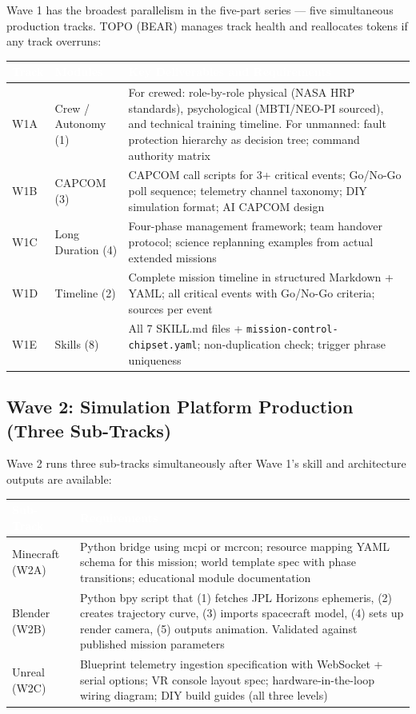 \documentclass[11pt,letterpaper]{article}
\newcommand{\tableheader}[1]{\textbf{\sffamily\textcolor{white}{#1}}}
\begin{document}
Wave 1 has the broadest parallelism in the five-part series --- five simultaneous production tracks. TOPO (BEAR) manages track health and reallocates tokens if any track overruns:

\begin{center}
\begin{tabularx}{\textwidth}{L{2cm}L{3cm}X}
\toprule
{}
\tableheader{Track} & \tableheader{Modules} & \tableheader{Key Deliverables and Requirements} \\
\midrule
W1A & Crew / Autonomy (1) & For crewed: role-by-role physical (NASA HRP standards), psychological (MBTI/NEO-PI sourced), and technical training timeline. For unmanned: fault protection hierarchy as decision tree; command authority matrix \\
W1B & CAPCOM (3) & CAPCOM call scripts for 3+ critical events; Go/No-Go poll sequence; telemetry channel taxonomy; DIY simulation format; AI CAPCOM design \\
W1C & Long Duration (4) & Four-phase management framework; team handover protocol; science replanning examples from actual extended missions \\
W1D & Timeline (2) & Complete mission timeline in structured Markdown + YAML; all critical events with Go/No-Go criteria; sources per event \\
W1E & Skills (8) & All 7 SKILL.md files + \texttt{mission-control-chipset.yaml}; non-duplication check; trigger phrase uniqueness \\
\bottomrule
\end{tabularx}
\end{center}

\subsection{Wave 2: Simulation Platform Production (Three Sub-Tracks)}

Wave 2 runs three sub-tracks simultaneously after Wave 1's skill and architecture outputs are available:

\begin{center}
\begin{tabularx}{\textwidth}{L{2.5cm}X}
\toprule
{}
\tableheader{Sub-Track} & \tableheader{Requirements} \\
\midrule
Minecraft (W2A) & Python bridge using mcpi or mcrcon; resource mapping YAML schema for this mission; world template spec with phase transitions; educational module documentation \\
Blender (W2B) & Python bpy script that (1) fetches JPL Horizons ephemeris, (2) creates trajectory curve, (3) imports spacecraft model, (4) sets up render camera, (5) outputs animation. Validated against published mission parameters \\
Unreal (W2C) & Blueprint telemetry ingestion specification with WebSocket + serial options; VR console layout spec; hardware-in-the-loop wiring diagram; DIY build guides (all three levels) \\
\bottomrule
\end{tabularx}
\end{center}
\end{document}
